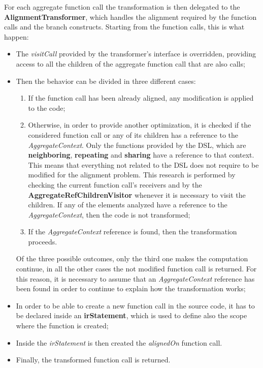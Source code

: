 For each aggregate function call the transformation is then delegated to the \textbf{AlignmentTransformer}, which handles the alignment required by the function calls and the branch constructs.\newline
Starting from the function calls, this is what happen:
\begin{itemize}
    \item The \textit{visitCall} provided by the transformer's interface is overridden, providing access to all the children of the aggregate function call that are also calls;
    \item Then the behavior can be divided in three different cases:
    \begin{enumerate}
        \item If the function call has been already aligned, any modification is applied to the code;
        \item Otherwise, in order to provide another optimization, it is checked if the considered function call or any of its children has a reference to the \textit{AggregateContext}. Only the functions provided by the DSL, which are \textbf{neighboring}, \textbf{repeating} and \textbf{sharing} have a reference to that context. This means that everything not related to the DSL does not require to be modified for the alignment problem. This research is performed by checking the current function call's receivers and by the \textbf{AggregateRefChildrenVisitor} whenever it is necessary to visit the children.\newline
        If any of the elements analyzed have a reference to the \textit{AggregateContext}, then the code is not transformed;
        \item If the \textit{AggregateContext} reference is found, then the transformation proceeds. 
    \end{enumerate}
    Of the three possible outcomes, only the third one makes the computation continue, in all the other cases the not modified function call is returned. For this reason, it is necessary to assume that an \textit{AggregateContext} reference has been found in order to continue to explain how the transformation works;
    \item In order to be able to create a new function call in the source code, it has to be declared inside an \textbf{irStatement}, which is used to define also the scope where the function is created;
    \item Inside the \textit{irStatement} is then created the \textit{alignedOn} function call.
    \item Finally, the transformed function call is returned.
\end{itemize}

